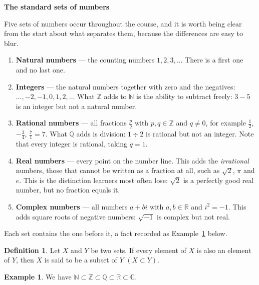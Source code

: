 \documentclass[11pt,a4paper]{article}
\theoremstyle{definition}
\newtheorem{defn}[thm]{Definition}
\newtheorem{exa}[thm]{Example}
\newcommand{\subhead}[1]{%
  \par\medskip\noindent\textbf{#1}\par\nobreak\smallskip}
\begin{document}
\subhead{The standard sets of numbers}
Five sets of numbers occur throughout the course, and it is worth being clear
from the start about what separates them, because the differences are easy to
blur.
\begin{enumerate}
\item[$\mathbb{N}$] \textbf{Natural numbers} --- the counting numbers
      $1,2,3,\dots$ There is a first one and no last one.
\item[$\mathbb{Z}$] \textbf{Integers} --- the natural numbers together with
      zero and the negatives: $\dots,-2,-1,0,1,2,\dots$ What $\mathbb{Z}$ adds
      to $\mathbb{N}$ is the ability to subtract freely: $3-5$ is an integer
      but not a natural number.
\item[$\mathbb{Q}$] \textbf{Rational numbers} --- all fractions
      $\frac{p}{q}$ with $p,q\in\mathbb{Z}$ and $q\neq 0$, for example
      $\frac{1}{2}$, $-\frac{3}{4}$, $\frac{7}{1}=7$. What $\mathbb{Q}$ adds is
      division: $1\div 2$ is rational but not an integer. Note that every
      integer is rational, taking $q=1$.
\item[$\mathbb{R}$] \textbf{Real numbers} --- every point on the number line.
      This adds the \emph{irrational} numbers, those that cannot be written as
      a fraction at all, such as $\sqrt{2}$, $\pi$ and $e$. This is the
      distinction learners most often lose: $\sqrt{2}$ is a perfectly good real
      number, but no fraction equals it.
\item[$\mathbb{C}$] \textbf{Complex numbers} --- all numbers $a+bi$ with
      $a,b\in\mathbb{R}$ and $i^2=-1$. This adds square roots of negative
      numbers: $\sqrt{-1}$ is complex but not real.
\end{enumerate}
Each set contains the one before it, a fact recorded as
Example~\ref{exa:number-chain} below.


\begin{defn}
Let $X$ and $Y$ be two sets. If every element of $X$ is also an element of $Y$, then $X$ is said to be a subset of $Y$ $(X\subset Y)$.
\end{defn}
\begin{exa}\label{exa:number-chain}
We have $\mathbb{N}\subset \mathbb{Z}\subset \mathbb{Q}\subset \mathbb{R}\subset \mathbb{C}$.
\end{exa}
\end{document}
